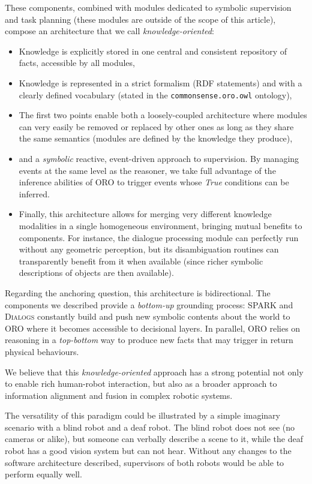 \documentclass[twocolumn]{svjour3}
\begin{document}
These components, combined with modules dedicated to symbolic supervision and
task planning (these modules are outside of the scope of this article), compose
an architecture that we call \emph{knowledge-oriented}:

\begin{itemize}
\item{Knowledge is explicitly stored in one central and consistent repository
of facts, accessible by all modules,}
\item{Knowledge is represented in a strict formalism (RDF statements) and
with a clearly defined vocabulary (stated in the {\tt commonsense.oro.owl}
ontology),}
\item{The first two points enable both a loosely-coupled
architecture where modules can very easily be removed or replaced by other ones
as long as they share the same semantics (modules are defined by the knowledge
they produce),}
\item{and a \emph{symbolic} reactive, event-driven approach
to supervision. By managing events at the same level as
the reasoner, we take full advantage of the inference abilities of ORO to
trigger events whose \textit{True} conditions can be inferred.}
\item{Finally, this architecture allows for merging very different knowledge
modalities in a single homogeneous environment, bringing mutual benefits to
components. For instance, the dialogue processing module can perfectly run
without any geometric perception, but its disambiguation routines can
transparently benefit from it when available (since richer symbolic
descriptions of objects are then available).}
\end{itemize}

Regarding the anchoring question, this architecture is
bidirectional. The components we described provide a \textit{bottom-up}
grounding process: SPARK and \textsc{Dialogs} constantly build and push new
symbolic contents about the world to ORO where it becomes accessible to
decisional layers. In parallel, ORO relies on reasoning in a \textit{top-bottom}
way to produce new facts that may trigger in return physical behaviours. 

We believe that this \emph{knowledge-oriented} approach has a strong potential
not only to enable rich human-robot interaction, but also as a broader approach
to information alignment and fusion in complex robotic systems.

The versatility of this paradigm could be illustrated by a simple imaginary
scenario with a blind robot and a deaf robot. The blind robot does not see (no
cameras or alike), but someone can verbally describe a scene to it, while the
deaf robot has a good vision system but can not hear.  Without any
changes to the software architecture described, supervisors of both robots would be able to perform equally well.
\end{document}
